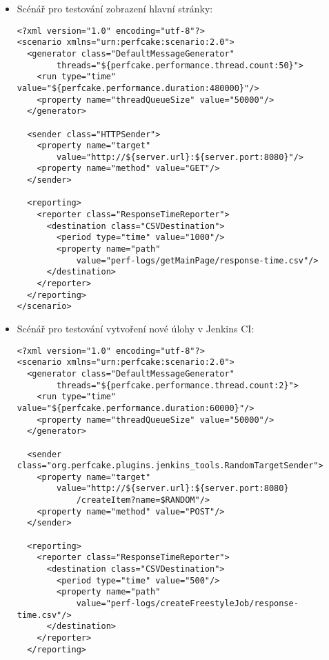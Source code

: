        \begin{itemize}
        \item Scénář pro testování zobrazení hlavní stránky:
\begin{verbatim}
<?xml version="1.0" encoding="utf-8"?>
<scenario xmlns="urn:perfcake:scenario:2.0">
  <generator class="DefaultMessageGenerator" 
        threads="${perfcake.performance.thread.count:50}">
    <run type="time" value="${perfcake.performance.duration:480000}"/>
    <property name="threadQueueSize" value="50000"/>
  </generator>
  
  <sender class="HTTPSender">
    <property name="target" 
        value="http://${server.url}:${server.port:8080}"/>
    <property name="method" value="GET"/>                                                                                               
  </sender>
  
  <reporting>
    <reporter class="ResponseTimeReporter">
      <destination class="CSVDestination">
        <period type="time" value="1000"/>
        <property name="path" 
            value="perf-logs/getMainPage/response-time.csv"/>
      </destination>
    </reporter>
  </reporting>
</scenario>
\end{verbatim}

        \newpage
        \item Scénář pro testování vytvoření nové úlohy v Jenkins CI:
\begin{verbatim}
<?xml version="1.0" encoding="utf-8"?>
<scenario xmlns="urn:perfcake:scenario:2.0">
  <generator class="DefaultMessageGenerator" 
        threads="${perfcake.performance.thread.count:2}">
    <run type="time" value="${perfcake.performance.duration:60000}"/>                                                                         
    <property name="threadQueueSize" value="50000"/>                                                                                         
  </generator>
              
  <sender class="org.perfcake.plugins.jenkins_tools.RandomTargetSender">
    <property name="target" 
        value="http://${server.url}:${server.port:8080}
            /createItem?name=$RANDOM"/>
    <property name="method" value="POST"/>
  </sender>

  <reporting>
    <reporter class="ResponseTimeReporter">
      <destination class="CSVDestination">
        <period type="time" value="500"/>
        <property name="path" 
            value="perf-logs/createFreestyleJob/response-time.csv"/>
      </destination>
    </reporter>
  </reporting>
    

\end{verbatim}
\end{itemize}
